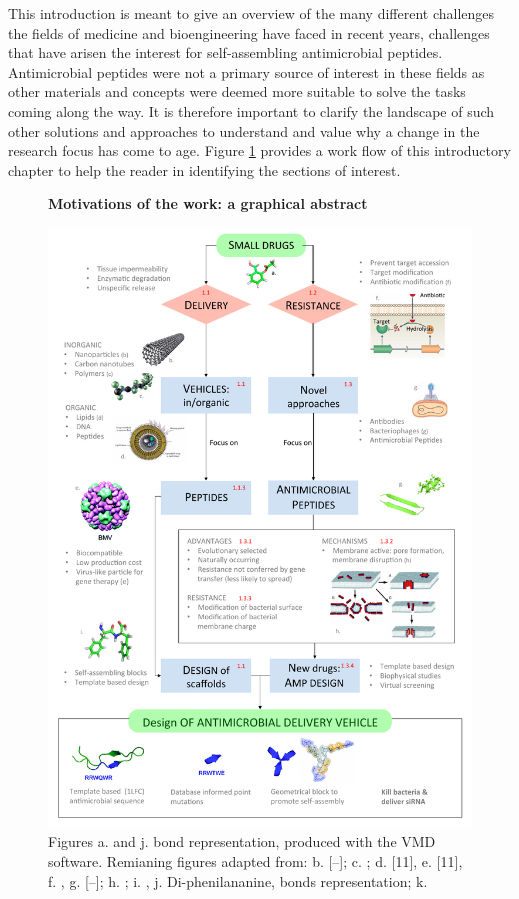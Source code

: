 \vspace{1cm}
This introduction is meant to give an overview of the many different challenges the fields of medicine and bioengineering have faced in recent years, challenges that have arisen the interest for self-assembling antimicrobial peptides. Antimicrobial peptides were not a primary source of interest in these fields as other materials and concepts were deemed more suitable to solve the tasks coming along the way. It is therefore important to clarify the landscape of such other solutions and approaches to understand and value why a change in the research focus has come to age. Figure \ref{fig:intro} provides a work flow of this introductory chapter to help the reader in identifying the sections of interest.

\begin{figure}
\begin{center}
\Large{\textbf{Motivations of the work: a graphical abstract}}\par\bigskip
\includegraphics[width = \textwidth]{pics/scheme_intro}
\caption{Figures a. and j. bond representation, produced with the VMD software. Remianing figures adapted from: b. [--]; c. \cite{poly}; d. [11], e. [11], f. \cite{Blair2014}, g. [--]; h. \cite{Torres2019}; i. \cite{Nguyen2011}, j. Di-phenilananine, bonds representation; k. \cite{Castelletto2016}} \label{fig:intro}
\end{center}
\end{figure}


